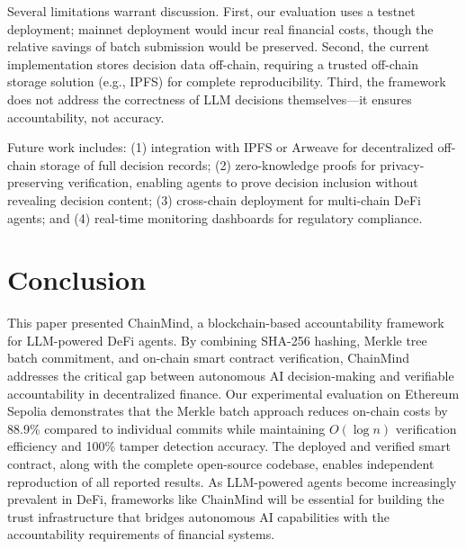 \documentclass[manuscript,nonacm]{acmart}
\begin{document}
Several limitations warrant discussion. First, our evaluation uses a testnet deployment; mainnet deployment would incur real financial costs, though the relative savings of batch submission would be preserved. Second, the current implementation stores decision data off-chain, requiring a trusted off-chain storage solution (e.g., IPFS) for complete reproducibility. Third, the framework does not address the correctness of LLM decisions themselves---it ensures accountability, not accuracy.

Future work includes: (1) integration with IPFS or Arweave for decentralized off-chain storage of full decision records; (2) zero-knowledge proofs for privacy-preserving verification, enabling agents to prove decision inclusion without revealing decision content; (3) cross-chain deployment for multi-chain DeFi agents; and (4) real-time monitoring dashboards for regulatory compliance.


\section{Conclusion}
\label{sec:conclusion}

This paper presented ChainMind, a blockchain-based accountability framework for LLM-powered DeFi agents. By combining SHA-256 hashing, Merkle tree batch commitment, and on-chain smart contract verification, ChainMind addresses the critical gap between autonomous AI decision-making and verifiable accountability in decentralized finance. Our experimental evaluation on Ethereum Sepolia demonstrates that the Merkle batch approach reduces on-chain costs by 88.9\% compared to individual commits while maintaining $O(\log n)$ verification efficiency and 100\% tamper detection accuracy. The deployed and verified smart contract, along with the complete open-source codebase, enables independent reproduction of all reported results. As LLM-powered agents become increasingly prevalent in DeFi, frameworks like ChainMind will be essential for building the trust infrastructure that bridges autonomous AI capabilities with the accountability requirements of financial systems.


\end{document}
